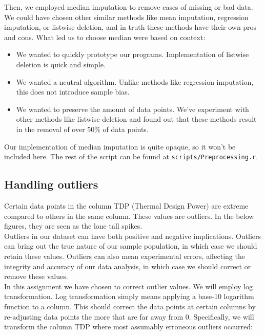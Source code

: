 Then, we employed median imputation to remove cases of missing or bad data. We could have chosen other similar methods like mean imputation, regression imputation, or listwise deletion, and in truth these methods have their own pros and cons. What led us to choose median were based on context:
\begin{itemize}
    \item We wanted to quickly prototype our programs. Implementation of listwise deletion is quick and simple.
    \item We wanted a neutral algorithm. Unlike methods like regression imputation, this does not introduce sample bias.
    \item We wanted to preserve the amount of data points. We've experiment with other methods like listwise deletion and found out that these methods result in the removal of over 50\% of data points.
\end{itemize}

Our implementation of median imputation is quite opaque, so it won't be included here. The rest of the script can be found at \lstinline{scripts/Preprocessing.r}.

\newpage
\subsection{Handling outliers}
Certain data points in the column TDP (Thermal Design Power) are extreme compared to others in the same column. These values are outliers. In the below figures, they are seen as the lone tall spikes.\\

Outliers in our dataset can have both positive and negative implications. Outliers can bring out the true nature of our sample population, in which case we should retain these values. Outliers can also mean experimental errors, affecting the integrity and accuracy of our data analysis, in which case we should correct or remove these values.\\

In this assignment we have chosen to correct outlier values. We will employ log transformation. Log transformation simply means applying a base-10 logarithm function to a column. This should correct the data points at certain columns by re-adjusting data points the more that are far away from 0. Specifically, we will transform the column TDP where most assumably erroneous outliers occurred:

